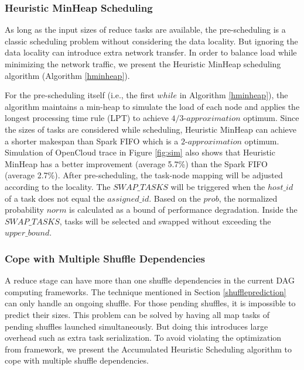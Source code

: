\subsubsection{Heuristic MinHeap Scheduling}\label{h-minheap}

As long as the input sizes of reduce tasks are available, the pre-scheduling is a classic scheduling problem without considering the data locality. 
But ignoring the data locality can introduce extra network transfer. 
In order to balance load while minimizing the network traffic, we present the Heuristic MinHeap scheduling algorithm (Algorithm \ref{hminheap}).   

For the pre-scheduling itself (i.e., the first $while$ in Algorithm \ref{hminheap}), the algorithm maintains a min-heap to simulate the load of each node 
and applies the longest processing time rule (LPT) \cite{design} to achieve $4/3\text{-}approximation$ optimum. 
Since the sizes of tasks are considered while scheduling, Heuristic MinHeap can achieve a shorter makespan than Spark FIFO which is a $2\text{-}approximation$ optimum. 
Simulation of OpenCloud trace in Figure \ref{fig:sim} also shows that Heuristic MinHeap has a better improvement (average 5.7\%) than the Spark FIFO (average 2.7\%).
After pre-scheduling, the task-node mapping will be adjusted according to the locality. 
The $SWAP\_TASKS$ will be triggered when the $host\_id$ of a task does not equal the $assigned\_id$.
Based on the $prob$, the normalized probability $norm$ is calculated as a bound of performance degradation. 
Inside the $SWAP\_TASKS$, tasks will be selected and swapped without exceeding the $upper\_bound$. 

\subsubsection{Cope with Multiple Shuffle Dependencies}
A reduce stage can have more than one shuffle dependencies in the current DAG computing frameworks. 
The technique mentioned in Section \ref{shuffleprediction} can only handle an ongoing shuffle. 
For those pending shuffles, it is impossible to predict their sizes. 
This problem can be solved by having all map tasks of pending shuffles launched simultaneously. 
But doing this introduces large overhead such as extra task serialization. 
To avoid violating the optimization from framework, we present the Accumulated Heuristic Scheduling algorithm to cope with multiple shuffle dependencies.

